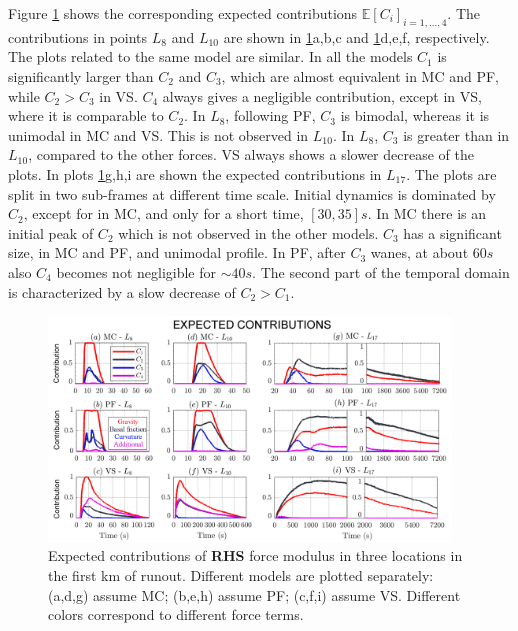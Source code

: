 \documentclass{article}
\begin{document}
Figure \ref{fig:Colima-Ci_1} shows the corresponding expected contributions $\mathbb E[C_i]_{i=1,\dots,4}$. The contributions in points $L_8$ and $L_{10}$ are shown in \ref{fig:Colima-Ci_1}a,b,c and \ref{fig:Colima-Ci_1}d,e,f, respectively. The plots related to the same model are similar. In all the models $C_1$ is significantly larger than $C_2$ and $C_3$, which are almost equivalent in MC and PF, while $C_2>C_3$ in VS. $C_4$ always gives a negligible contribution, except in VS, where it is comparable to $C_2$. In $L_8$, following PF, $C_3$ is bimodal, whereas it is unimodal in MC and VS. This is not observed in $L_{10}$. In $L_8$, $C_3$ is greater than in $L_{10}$, compared to the other forces. VS always shows a slower decrease of the plots. In plots \ref{fig:Colima-Ci_1}g,h,i are shown the expected contributions in $L_{17}$. The plots are split in two sub-frames at different time scale. Initial dynamics is dominated by $C_2$, except for in MC, and only for a short time, $[30, 35] s$. In MC there is an initial peak of $C_2$ which is not observed in the other models. $C_3$ has a significant size, in MC and PF, and unimodal profile. In PF, after $C_3$ wanes, at about $60 s$ also $C_4$ becomes not negligible for $\sim 40 s$. The second part of the temporal domain is characterized by a slow decrease of $C_2>C_1$.
\begin{figure}[H]
         \centering
        \includegraphics[width=0.95\textwidth]{BAF_VolcanDeColima/ForceContrib/Ci1_total.png}
        \caption{Expected contributions of \textbf{RHS} force modulus in three locations in the first km of runout. Different models are plotted separately: (a,d,g) assume MC; (b,e,h) assume PF; (c,f,i) assume VS. Different colors correspond to different force terms.}
        \label{fig:Colima-Ci_1}
\end{figure}
\end{document}
